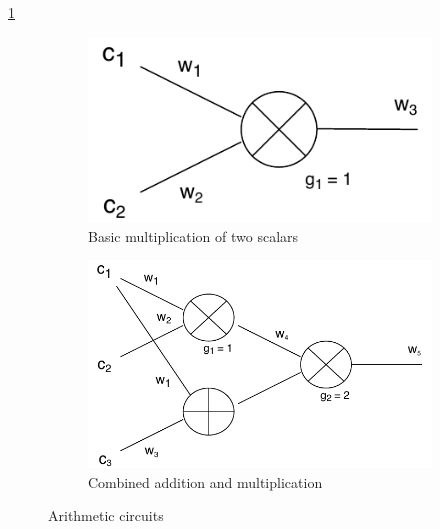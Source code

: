 \documentclass[11pt,oneside]{article}
\theoremstyle{definition}
\theoremstyle{remark}
\numberwithin{equation}{section}
\begin{document}
\ref{fig:arith:basic} \begin{figure}[h] \begin{center} \vspace{3pt}
  \begin{subfigure}[b]{0.35\textwidth}
  \includegraphics[width=\textwidth]{arith_circ/basic1.pdf} \caption{Basic
multiplication of two scalars} \label{fig:arith:basic} \end{subfigure}
\hspace{1cm}
  \begin{subfigure}[b]{0.4\textwidth}
  \includegraphics[width=\textwidth]{arith_circ/add_mult.pdf} \caption{Combined
addition and multiplication} \label{fig:arith:add_mult} \end{subfigure}
\caption{Arithmetic circuits} \end{center} \end{figure} 
\end{document}
